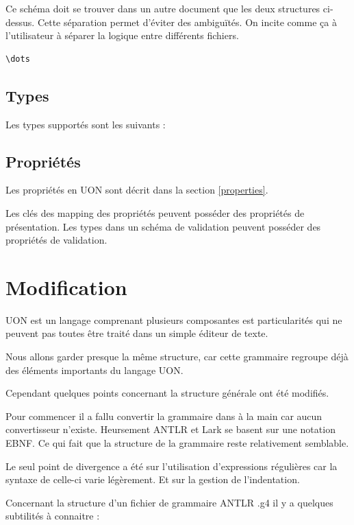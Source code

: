 \documentclass[
    iict, %
    il, %
]{heig-tb}
\begin{document}
Ce schéma doit se trouver dans un autre document que les deux structures ci-dessus.
Cette séparation permet d'éviter des ambiguïtés. On incite comme ça à l'utilisateur à séparer la logique entre différents fichiers.

\begin{lstlisting}[frame=single,caption={Exemple d'un schéma de validation},captionpos=b,label={yaml-seq}]
    \dots
\end{lstlisting}

\subsection{Types}
Les types supportés sont les suivants :

\subsection{Propriétés}

Les propriétés en UON sont décrit dans la section \ref{properties}.

Les clés des mapping des propriétés peuvent posséder des propriétés de présentation.
Les types dans un schéma de validation peuvent posséder des propriétés de validation.

\section{Modification}\label{modification}

UON est un langage comprenant plusieurs composantes est particularités qui ne peuvent pas toutes être traité dans un simple éditeur de texte.

Nous allons garder presque la même structure, car cette grammaire regroupe déjà des éléments importants du langage UON.

Cependant quelques points concernant la structure générale ont été modifiés.

Pour commencer il a fallu convertir la grammaire dans à la main car aucun convertisseur n’existe. Heursement ANTLR et Lark se basent sur une notation EBNF.
Ce qui fait que la structure de la grammaire reste relativement semblable.

Le seul point de divergence a été sur l'utilisation d'expressions régulières car la syntaxe de celle-ci varie légèrement. Et sur la gestion de l'indentation.

Concernant la structure d'un fichier de grammaire ANTLR .g4 il y a quelques subtilités à connaitre :
\end{document}
